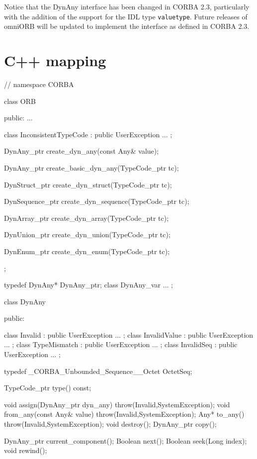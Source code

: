 \documentclass[11pt,twoside,a4paper]{book}
\newcommand{\type}[1]{\texttt{#1}}
\begin{document}
Notice that the DynAny interface has been changed in CORBA 2.3,
particularly with the addition of the support for the IDL type
\type{valuetype}.  Future releases of omniORB will be updated to
implement the interface as defined in CORBA 2.3.

\section{C++ mapping}

\begin{cxxlisting}
// namespace CORBA

class ORB {
public:
  ...

  class InconsistentTypeCode : public UserException { ... };

  DynAny_ptr create_dyn_any(const Any& value);

  DynAny_ptr create_basic_dyn_any(TypeCode_ptr tc);

  DynStruct_ptr create_dyn_struct(TypeCode_ptr tc);

  DynSequence_ptr create_dyn_sequence(TypeCode_ptr tc);

  DynArray_ptr create_dyn_array(TypeCode_ptr tc);

  DynUnion_ptr create_dyn_union(TypeCode_ptr tc);

  DynEnum_ptr create_dyn_enum(TypeCode_ptr tc);

};

typedef DynAny* DynAny_ptr;
class DynAny_var { ... };

class DynAny {
public:    

  class Invalid : public UserException { ... };
  class InvalidValue : public UserException { ... };
  class TypeMismatch : public UserException { ... };
  class InvalidSeq : public UserException { ... };

  typedef _CORBA_Unbounded_Sequence__Octet OctetSeq;

  TypeCode_ptr type() const;

  void assign(DynAny_ptr dyn_any) throw(Invalid,SystemException);
  void from_any(const Any& value) throw(Invalid,SystemException);
  Any* to_any() throw(Invalid,SystemException);
  void destroy();
  DynAny_ptr copy();

  DynAny_ptr current_component();
  Boolean next();
  Boolean seek(Long index);
  void rewind();

}
\end{cxxlisting}
\end{document}
